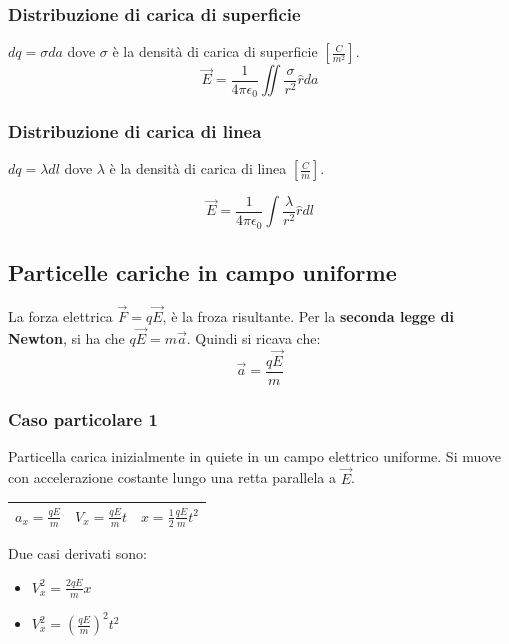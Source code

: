 \subsubsection{Distribuzione di carica di superficie}
$dq = \sigma da$ dove $\sigma$ è la densità di carica di superficie $[\frac{C}{m^2}]$.
\begin{equation}
    \vec{E} = \frac{1}{4\pi \epsilon_0}\iint{\frac{\sigma}{r^2}\hat{r}da}
\end{equation}

\subsubsection{Distribuzione di carica di linea}
$dq = \lambda dl$ dove $\lambda$ è la densità di carica di linea $[\frac{C}{m}]$.

\begin{equation}
    \vec{E} = \frac{1}{4\pi \epsilon_0}\int{\frac{\lambda}{r^2}\hat{r}dl}
\end{equation}

\subsection{Particelle cariche in campo uniforme}
La forza elettrica $\vec{F}=q\vec{E}$, è la froza risultante.
Per la \textbf{seconda legge di Newton}, si ha che $q\vec{E} = m\vec{a}$.
Quindi si ricava che:
\begin{equation}
    \vec{a} = \frac{q\vec{E}}{m}
\end{equation}

\subsubsection{Caso particolare 1}
Particella carica inizialmente in quiete in un campo elettrico uniforme.
Si muove con accelerazione costante lungo una retta parallela a $\vec{E}$.

\begin{center}
    \begin{tabular}{|c|c|c|}
        \hline 
        $a_x=\frac{qE}{m}$ & $V_x = \frac{qE}{m}t$ & $x = \frac{1}{2}\frac{qE}{m}t^2$ \\ [0.5ex]
        \hline
    \end{tabular}
\end{center}
Due casi derivati sono:
\begin{itemize}
    \item $V_x^2 = \frac{2qE}{m}x$
    \item $V_x^2 = (\frac{qE}{m})^2t^2$
\end{itemize}

